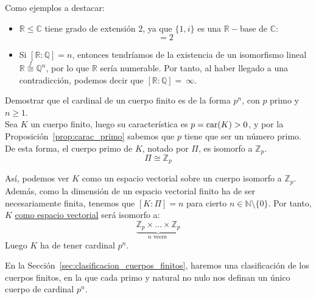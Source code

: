 \begin{ejemplo}
    Como ejemplos a destacar:
    \begin{itemize}
        \item $\mathbb{R}\leq \mathbb{C}$ tiene grado de extensión $2$, ya que $\{1,i\}$ es una $\mathbb{R}-$base de $\mathbb{C}$:
            \begin{equation*}
                [\mathbb{C}:\mathbb{R}] = 2
            \end{equation*}
        \item Si $[\mathbb{R}:\mathbb{Q}] = n$, entonces tendríamos de la existencia de un isomorfismo lineal $\mathbb{R}\stackrel{f}{\cong} \mathbb{Q}^n$, por lo que $\mathbb{R}$ sería numerable. Por tanto, al haber llegado a una contradicción, podemos decir que $[\mathbb{R}:\mathbb{Q}]=~\infty$.
    \end{itemize}
\end{ejemplo}

\begin{ejercicio}\label{ej:cardinal_cuerpo}
    Demostrar que el cardinal de un cuerpo finito es de la forma $p^n$, con $p$ primo y $n\geq 1$.\\

    \noindent
    Sea $K$ un cuerpo finito, luego su característica es $p = \operatorname{car}(K) > 0$, y por la Proposición~\ref{prop:carac_primo} sabemos que $p$ tiene que ser un número primo. De esta forma, el cuerpo primo de $K$, notado por $\Pi$, es isomorfo a $\mathbb{Z}_p$.
    \begin{equation*}
        \Pi \cong \mathbb{Z}_p
    \end{equation*}
    
    Así, podemos ver $K$ como un espacio vectorial sobre un cuerpo isomorfo a $\mathbb{Z}_p$. Además, como la dimensión de un espacio vectorial finito ha de ser necesariamente finita, tenemos que $[K:\Pi] = n$ para cierto $n\in \mathbb{N}\setminus \{0\}$. Por tanto, $K$ \underline{como espacio vectorial} será isomorfo a:
    \begin{equation*}
        \underbrace{\mathbb{Z}_p\times \ldots \times \mathbb{Z}_p}_{n\text{ veces }}
    \end{equation*}
    Luego $K$ ha de tener cardinal $p^n$.
\end{ejercicio}

\noindent
En la Sección~\ref{sec:clasificacion_cuerpos_finitos}, haremos una clasificación de los cuerpos finitos, en la que cada primo y natural no nulo nos definan un único cuerpo de cardinal $p^n$.

